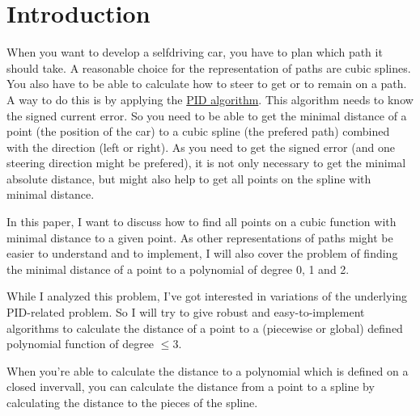 \chapter*{Introduction}
When you want to develop a selfdriving car, you have to plan which path 
it should take. A reasonable choice for the representation of
paths are cubic splines. You also have to be able to calculate
how to steer to get or to remain on a path. A way to do this
is by applying the \href{https://en.wikipedia.org/wiki/PID_algorithm}{PID algorithm}.
This algorithm needs to know the signed current error. So you need to 
be able to get the minimal distance of a point (the position of the car)
to a cubic spline (the prefered path)
combined with the direction (left or right).
As you need to get the signed error (and one steering direction might
be prefered), it is not only necessary to
get the minimal absolute distance, but might also help to get all points
on the spline with minimal distance.

In this paper, I want to discuss how to find all points on a cubic 
function with minimal distance to a given point.
As other representations of paths might be easier to understand and
to implement, I will also cover the problem of finding the minimal
distance of a point to a polynomial of degree 0, 1 and 2.

While I analyzed this problem, I've got interested in variations
of the underlying PID-related problem. So I will try to give
robust and easy-to-implement algorithms to calculate the distance
of a point to a (piecewise or global) defined polynomial function
of degree $\leq 3$.

When you're able to calculate the distance to a polynomial which is
defined on a closed invervall, you can calculate the distance from
a point to a spline by calculating the distance to the pieces of the
spline.
